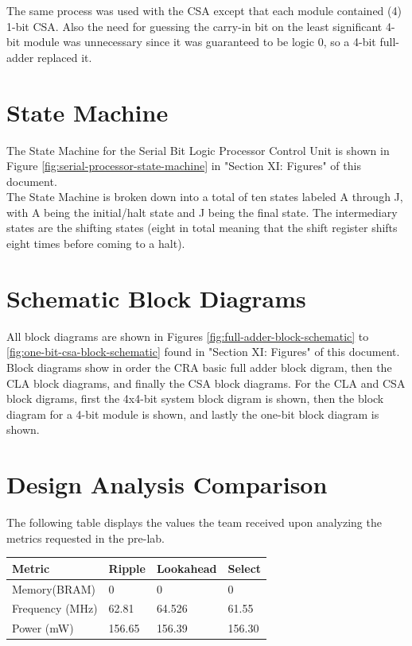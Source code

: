 \documentclass[journal, twocolumn, final,11pt,letterpaper]{IEEEtran}
\begin{document}
The same process was used with the CSA except that each module contained (4) 1-bit CSA.  Also the need for guessing the carry-in bit on the least significant 4-bit module was unnecessary since it was guaranteed to be logic 0, so a 4-bit full-adder replaced it. \\

\section{State Machine}
The State Machine for the Serial Bit Logic Processor Control Unit is shown in Figure  \ref{fig:serial-processor-state-machine} in "Section XI: Figures" of this document.  \\

The State Machine is broken down into a total of ten states labeled A through J, with A being the initial/halt state and J being the final state. The intermediary states are the shifting states (eight in total meaning that the shift register shifts eight times before coming to a halt).
	
\section{Schematic Block Diagrams}
All block diagrams are shown in Figures \ref{fig:full-adder-block-schematic} to \ref{fig:one-bit-csa-block-schematic} found in "Section XI: Figures" of this document.  Block diagrams show in order the CRA basic full adder block digram, then the CLA block diagrams, and finally the CSA block diagrams.  For the CLA and CSA block digrams, first the 4x4-bit system block digram is shown, then the block diagram for a 4-bit module is shown, and lastly the one-bit block diagram is shown.    


\section{Design Analysis Comparison}
The following table displays the values the team received upon analyzing the metrics requested in the pre-lab.
\begin{center}
	\begin{tabular}{l|lll}
		Metric & Ripple & Lookahead & Select \\ \hline
		Memory(BRAM) & 0 & 0 & 0 \\
		Frequency (MHz) & 62.81 & 64.526 & 61.55\\
		Power (mW) & 156.65 & 156.39 & 156.30\\
	\end{tabular}
\end{center}
\end{document}
